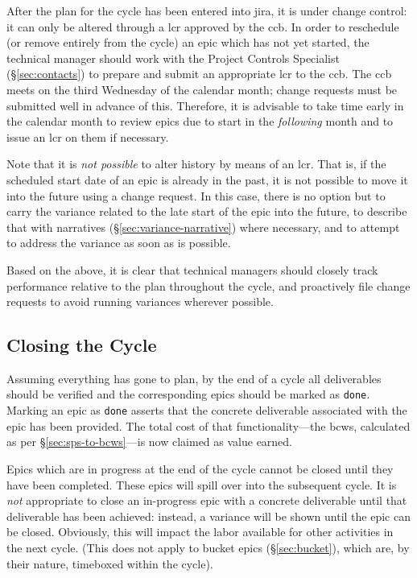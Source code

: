 After the plan for the \gls{cycle} has been entered into \gls{jira}, it is under change control: it can only be altered through a \gls{lcr} approved by the \gls{ccb}.
In order to reschedule (or remove entirely from the \gls{cycle}) an \gls{epic} which has not yet started, the technical manager should work with the Project Controls Specialist (\S\ref{sec:contacts}) to prepare and submit an appropriate \gls{lcr} to the \gls{ccb}.
The \gls{ccb} meets on the third Wednesday of the calendar month; change requests must be submitted well in advance of this.
Therefore, it is advisable to take time early in the calendar month to review \glspl{epic} due to start in the \emph{following} month and to issue an \gls{lcr} on them if necessary.

Note that it is \emph{not possible} to alter history by means of an \gls{lcr}.
That is, if the scheduled start date of an \gls{epic} is already in the past,
it is not possible to move it into the future using a change request. In
this case, there is no option but to carry the variance related to the
late start of the \gls{epic} into the future, to describe that with narratives
(\S\ref{sec:variance-narrative}) where necessary, and to
attempt to address the variance as soon as is possible.

Based on the above, it is clear that technical managers should closely track performance relative to the plan throughout the \gls{cycle}, and proactively file change requests to avoid running variances wherever possible.

\subsection{Closing the Cycle}
\label{sec:cycle-close}

Assuming everything has gone to plan, by the end of a \gls{cycle} all deliverables should be verified and the corresponding \glspl{epic} should be marked as \texttt{done}.
Marking an \gls{epic} as \texttt{done} asserts that the concrete deliverable associated with the \gls{epic} has been provided.
The total cost of that functionality---the \gls{bcws}, calculated as per \S\ref{sec:sps-to-bcws}---is now claimed as value earned.

Epics which are in progress at the end of the \gls{cycle} cannot be closed until they have been completed.
These \glspl{epic} will spill over into the subsequent \gls{cycle}.
It is \emph{not} appropriate to close an in-progress \gls{epic} with a concrete deliverable until that deliverable has been achieved: instead, a variance will be shown until the \gls{epic} can be closed.
Obviously, this will impact the labor available for other activities in the next \gls{cycle}.
(This does not apply to bucket \glspl{epic} (\S\ref{sec:bucket}), which are, by their nature, \gls{timebox}ed within the \gls{cycle}).


